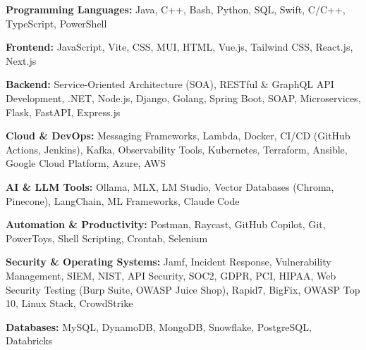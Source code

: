 \textbf{Programming Languages:} Java, C++, Bash, Python, SQL, Swift, C/C++, TypeScript, PowerShell
\vspace{3pt}

\textbf{Frontend:} JavaScript, Vite, CSS, MUI, HTML, Vue.js, Tailwind CSS, React.js, Next.js
\vspace{3pt}

\textbf{Backend:} Service-Oriented Architecture (SOA), RESTful \& GraphQL API Development, .NET, Node.js, Django, Golang, Spring Boot, SOAP, Microservices, Flask, FastAPI, Express.js
\vspace{3pt}

\textbf{Cloud \& DevOps:} Messaging Frameworks, Lambda, Docker, CI/CD (GitHub Actions, Jenkins), Kafka, Observability Tools, Kubernetes, Terraform, Ansible, Google Cloud Platform, Azure, AWS
\vspace{3pt}

\textbf{AI \& LLM Tools:} Ollama, MLX, LM Studio, Vector Databases (Chroma, Pinecone), LangChain, ML Frameworks, Claude Code
\vspace{3pt}

\textbf{Automation \& Productivity:} Postman, Raycast, GitHub Copilot, Git, PowerToys, Shell Scripting, Crontab, Selenium
\vspace{3pt}

\textbf{Security \& Operating Systems:} Jamf, Incident Response, Vulnerability Management, SIEM, NIST, API Security, SOC2, GDPR, PCI, HIPAA, Web Security Testing (Burp Suite, OWASP Juice Shop), Rapid7, BigFix, OWASP Top 10, Linux Stack, CrowdStrike
\vspace{3pt}

\textbf{Databases:} MySQL, DynamoDB, MongoDB, Snowflake, PostgreSQL, Databricks